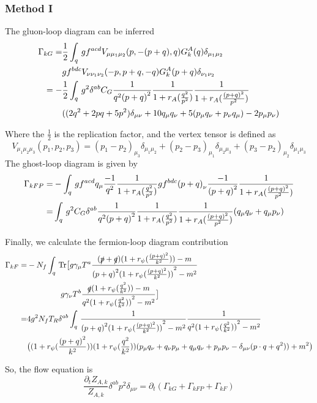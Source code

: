 \documentclass[UTF8]{ctexart}
\begin{document}
\subsubsection{Method I}
\par The gluon-loop diagram can be inferred
\begin{align}
\Gamma_{kG}
=&{\frac{1}{2}}\int_{q}\,gf^{acd}V_{\mu \mu_1 \mu_2}(p,-(p+q),q)G_{k}^{A}(q)\delta_{\mu_1 \mu_2}
\notag\\&gf^{bdc}V_{\nu \nu_1 \nu_2}(-p,p+q,-q)G_{k}^{A}(p+q)\delta_{\nu_1 \nu_2}
\notag\\=-&\frac{1}{2}\int_{q}\,g^{2}\delta^{ab}C_{G}{\frac{1}{q^{2}{(p+q)}^2}}{\frac{1}{1+r_{A}(\frac{q^2}{p^2})}}{\frac{1}{1+r_{A}(\frac{{(p+q)}^2}{p^2})}}
\notag\\&((2q^2+2pq+5p^2)\delta_{\mu\nu}+10q_{\mu}q_{\nu}+5(p_{\mu}q_{\nu}+p_{\nu}q_{\mu})-2p_{\mu}p_{\nu})
\end{align}
\par Where the $\frac{1}{2}$ is the replication factor, and the vertex tensor is defined as
\begin{equation}
V_{\mu_1 \mu_2 \mu_3}(p_1,p_2,p_3)={(p_1-p_2)}_{\mu_3}\delta_{\mu_1 \mu_2}+{(p_2-p_3)}_{\mu_1}\delta_{\mu_2 \mu_3}+{(p_3-p_2)}_{\mu_2}\delta_{\mu_1 \mu_3}
\end{equation}
The ghost-loop diagram is given by
\begin{align}
\Gamma_{kFP}
=&-\int_{q}\,gf^{acd}q_{\mu}{\frac{-1}{q^2}}{\frac{1}{1+r_{A}(\frac{q^2}{p^2})}}gf^{bdc}{(p+q)}_{\nu}{\frac{-1}{{(p+q)}^2}}{\frac{1}{1+r_{A}(\frac{{(p+q)}^2}{p^2})}}
\notag\\=&\int_{q}\,g^2 C_{G}\delta^{ab}\frac{1}{q^{2}{(p+q)}^2}{\frac{1}{1+r_{A}(\frac{q^2}{p^2})}}{\frac{1}{1+r_{A}(\frac{{(p+q)}^2}{p^2})}}(q_{\mu}q_{\nu}+q_{\mu}p_{\nu})
\end{align}
\par Finally, we calculate the fermion-loop diagram contribution
\begin{align}
\Gamma_{kF}
=&-N_{f}\int_{q}\,\mathrm{Tr}\big[g\gamma_{\mu}T^{a}{\frac{(\slashed{p}+\slashed{q})(1+r_{\psi}(\frac{{(p+q)}^2}{k^2}))-m}{{(p+q)}^2{(1+r_{\psi}(\frac{{(p+q)}^2}{k^2}))}^2-m^2}}
\notag\\&\,\,\,\,\,\,\,\,\,\,\,\,\,\,\,\,\,\,\,\,\,\,\,\,\,\,g\gamma_{\nu}T^{b}{\frac{\slashed{q}(1+r_{\psi}(\frac{{q}^2}{k^2}))-m}{{q}^2{(1+r_{\psi}(\frac{{q}^2}{k^2}))}^2-m^2}}\big]
\notag\\=&4g^{2}N_{f}T_{R}\delta^{ab}\int_{q}\,\frac{1}{{(p+q)}^2{(1+r_{\psi}(\frac{{(p+q)}^2}{k^2}))}^2-m^2}\frac{1}{{q}^2{(1+r_{\psi}(\frac{{q}^2}{k^2}))}^2-m^2}
\notag\\&\big((1+r_{\psi}(\frac{{(p+q)}^2}{k^2}))(1+r_{\psi}(\frac{{q}^2}{k^2}))(p_{\mu}q_{\nu}+q_{\nu}p_{\mu}+q_{\mu}q_{\nu}+p_{\mu}p_{\nu}-\delta_{\mu\nu}(p\cdot q+q^2))+m^2\big)
\end{align}
\par So, the flow equation is
\begin{equation}
\frac{\partial_{t}Z_{A,k}}{Z_{A,k}}\delta^{ab}p^{2}\delta_{\mu\nu}=\partial_{t}(\Gamma_{kG}+\Gamma_{kFP}+\Gamma_{kF})
\end{equation}
\end{document}
